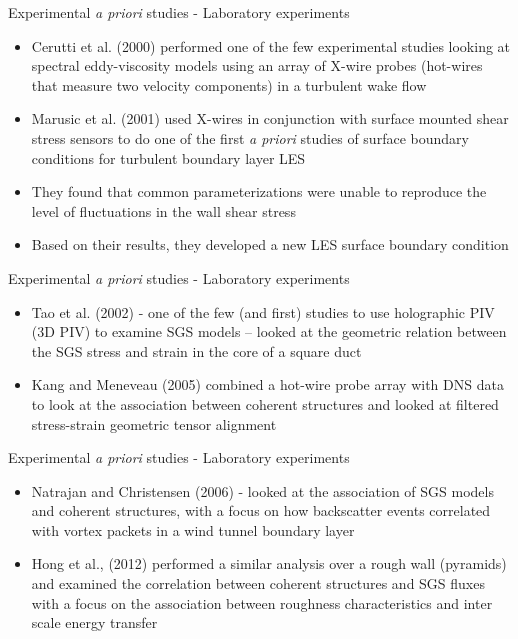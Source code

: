 
\begin{frame}{Experimental {\it a priori} studies - Laboratory experiments}
\begin{itemize}
	\item Cerutti et al. (2000) performed one of the few experimental studies looking at spectral eddy-viscosity models using an array of X-wire probes (hot-wires that measure two velocity components) in a turbulent wake flow
	\item Marusic et al. (2001) used X-wires in conjunction with surface mounted shear stress sensors to do one of the first {\it a priori} studies of surface boundary conditions for turbulent boundary layer LES
	\item They found that common parameterizations were unable to reproduce the level of fluctuations in the wall shear stress
	\item Based on their results, they developed a new LES surface boundary condition
	\end{itemize}
\end{frame}


\begin{frame}{Experimental {\it a priori} studies - Laboratory experiments}
\begin{itemize}
	\item Tao et al. (2002) - one of the few (and first) studies to use holographic PIV (3D PIV) to examine SGS models -- looked at the geometric relation between the SGS stress and strain in the core of a square duct
	\item Kang and Meneveau (2005) combined a hot-wire probe array with DNS data to look at the association between coherent structures and looked at filtered stress-strain geometric tensor alignment
	\end{itemize}
\end{frame}


\begin{frame}{Experimental {\it a priori} studies - Laboratory experiments}
\begin{itemize}
	\item Natrajan and Christensen (2006) - looked at the association of SGS models and coherent structures, with a focus on how backscatter events correlated with vortex packets in a wind tunnel boundary layer
	\item Hong et al., (2012) performed a similar analysis over a rough wall (pyramids) and examined the correlation between coherent structures and SGS fluxes with a focus on the association between roughness characteristics and inter scale energy transfer
	\end{itemize}
\end{frame}

